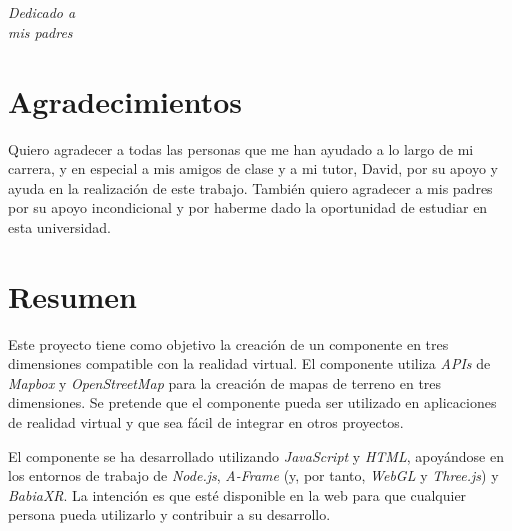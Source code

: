 \documentclass[a4paper, 12pt]{book}
\begin{document}

\chapter*{}
\begin{flushright}
\textit{Dedicado a \\
mis padres}
\end{flushright}


\chapter*{Agradecimientos}

Quiero agradecer a todas las personas que me han ayudado a lo largo de mi carrera, y en especial a mis amigos de clase
y a mi tutor, David, por su apoyo y ayuda en la realización de este trabajo. También quiero agradecer a mis padres por su apoyo incondicional 
y por haberme dado la oportunidad de estudiar en esta universidad.


\chapter*{Resumen}

Este proyecto tiene como objetivo la creación de un componente en tres dimensiones compatible
con la realidad virtual. El componente utiliza \textit{APIs} de \textit{Mapbox} y \textit{OpenStreetMap} 
para la creación de mapas de terreno en tres dimensiones. Se pretende que el componente
pueda ser utilizado en aplicaciones de realidad virtual y que sea fácil de integrar
en otros proyectos.

El componente se ha desarrollado utilizando \textit{JavaScript} y \textit{HTML}, apoyándose en
los entornos de trabajo de \textit{Node.js}, \textit{A-Frame} (y, por tanto, \textit{WebGL} y \textit{Three.js}) y \textit{BabiaXR}.
La intención es que esté disponible en la web para que cualquier persona pueda
utilizarlo y contribuir a su desarrollo.
\end{document}
